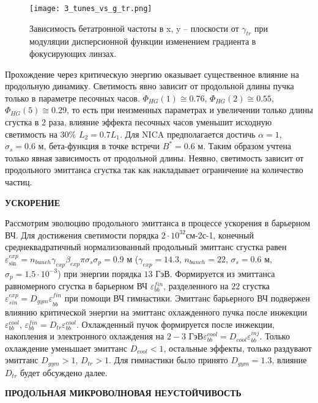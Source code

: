 \begin{figure}
   \texttt{[image: 3\_tunes\_vs\_g\_tr.png]}
   \caption{Зависимость бетатронной частоты в x, y – плоскости от $\gamma_{tr}$ при модуляции дисперсионной функции изменением градиента в фокусирующих линзах.}
   \label{fig:3_tunes_vs_g_tr.png}
\end{figure}

\par Прохождение через критическую энергию оказывает существенное влияние на продольную динамику. Светимость явно зависит от продольной длины пучка только в параметре песочных часов. $\Phi_{HG}(1)\cong0.76$, $\Phi_{HG}(2)\cong0.55$, $\Phi_{HG}(5)\cong0.29$, то есть при неизменных параметрах и увеличении только длины сгустка в $2$ раза, влияние эффекта песочных часов уменьшит исходную светимость на $30\%$ $L_2=0.7L_1$. Для NICA предполагается достичь $\alpha=1$, $\sigma_s=0.6$ м, бета-функция в точке встречи $B^\ast=0.6$ м. Таким образом учтена только явная зависимость от продольной длины. Неявно, светимость зависит от продольного эмиттанса сгустка так как накладывает ограничение на количество частиц.

	\textbf{УСКОРЕНИЕ}

\par Рассмотрим эволюцию продольного эмиттанса в процессе ускорения в барьерном ВЧ. 
Для достижения светимости порядка $2 \cdot 10^{32}$см-2с-1, конечный среднеквадратичный нормализованный продольный эмиттанс сгустка равен $\varepsilon_{\sin}^{exp}=n_{bunch}\gamma_{exp}\beta_{exp}\pi\sigma_s\sigma_p=0.9$ м ($\gamma_{exp}=14.3$, $n_{bunch}=22$, $\sigma_s=0.6$ м, $\sigma_p=1.5\cdot 10^{-3}$) при энергии порядка $13$ ГэВ. 
Формируется из эмиттанса равномерного сгустка в барьерном ВЧ $\varepsilon_{bb}^{fin}$, разделенного на $22$ сгустка $\varepsilon_{sin}^{exp}={D_{gym}\varepsilon}_{bb}^{fin}$ при помощи ВЧ гимнастики. 
Эмиттанс барьерного ВЧ подвержен влиянию критической энергии на эмиттанс охлажденного пучка после инжекции $\varepsilon_{bb}^{cool}$, $\varepsilon_{bb}^{fin}=D_{tr}\varepsilon_{bb}^{cool}$. 
Охлажденный пучок формируется после инжекции, накопления и электронного охлаждения на $2-3$ ГэВ$\varepsilon_{bb}^{cool}=D_{cool}\varepsilon_{bb}^{inj}$. 
Только охлаждение уменьшает эмиттанс $D_{cool}<1$, остальные эффекты, только раздувают эмиттанс $D_{gym}>1$, $D_{tr}>1$. 
Для гимнастики было принято $D_{gym}=1.3$, влияние $D_{tr}$ будет обсуждено далее.

	\textbf{ПРОДОЛЬНАЯ МИКРОВОЛНОВАЯ НЕУСТОЙЧИВОСТЬ}
	

